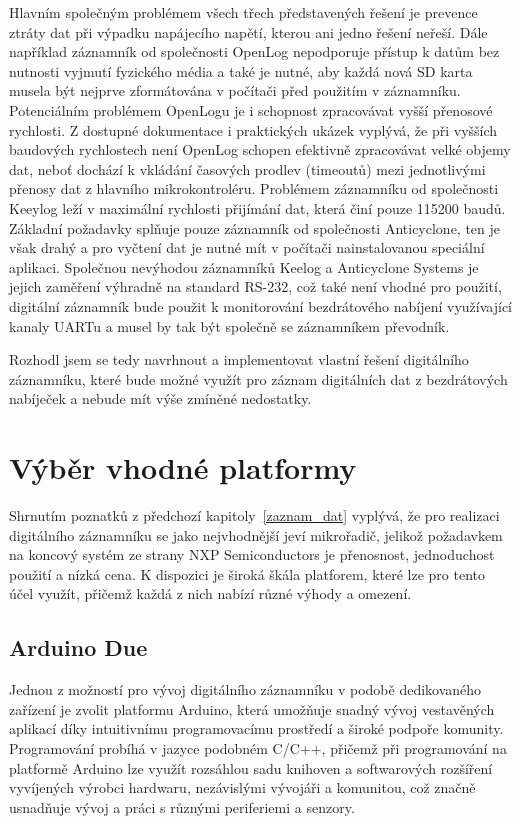 Hlavním společným problémem všech třech představených řešení je prevence ztráty dat při výpadku napájecího napětí, kterou ani jedno řešení neřeší. Dále například záznamník od společnosti OpenLog nepodporuje přístup k datům bez nutnosti vyjmutí fyzického média a také je nutné, aby každá nová SD karta musela být nejprve zformátována v počítači před použitím v záznamníku. Potenciálním problémem OpenLogu je i schopnost zpracovávat vyšší přenosové rychlosti. Z dostupné dokumentace i praktických ukázek vyplývá, že při vyšších baudových rychlostech není OpenLog schopen efektivně zpracovávat velké objemy dat, neboť dochází k vkládání časových prodlev (timeoutů) mezi jednotlivými přenosy dat z hlavního mikrokontroléru. Problémem záznamníku od společnosti Keeylog leží v maximální rychlosti přijímání dat, která činí pouze 115200 baudů. Základní požadavky splňuje pouze záznamník od společnosti Anticyclone, ten je však drahý a pro vyčtení dat je nutné mít v počítači nainstalovanou speciální aplikaci. Společnou nevýhodou záznamníků Keelog a Anticyclone Systems je jejich zaměření výhradně na standard RS-232, což také není vhodné pro použití, digitální záznamník bude použit k monitorování bezdrátového nabíjení využívající kanaly UARTu a musel by tak být společně se záznamníkem převodník.

Rozhodl jsem se tedy navrhnout a implementovat vlastní řešení digitálního záznamníku, které bude možné využít pro záznam digitálních dat z bezdrátových nabíječek a nebude mít výše zmíněné nedostatky.

\section{Výběr vhodné platformy}
\label{vyber_vhodne_platformy}
Shrnutím poznatků z předchozí kapitoly~\ref{zaznam_dat} vyplývá, že pro realizaci digitálního záznamníku se jako nejvhodnější jeví mikrořadič, jelikož požadavkem na koncový systém ze strany NXP Semiconductors je přenosnost, jednoduchost použití a nízká cena. K dispozici je široká škála platforem, které lze pro tento účel využít, přičemž každá z nich nabízí různé výhody a omezení.


\subsection{Arduino Due}
Jednou z možností pro vývoj digitálního záznamníku v podobě dedikovaného zařízení je zvolit platformu Arduino, která umožňuje snadný vývoj vestavěných aplikací díky intuitivnímu programovacímu prostředí a široké podpoře komunity. Programování probíhá v jazyce podobném C/C++, přičemž při programování na platformě Arduino lze využít rozsáhlou sadu knihoven a softwarových rozšíření vyvíjených výrobci hardwaru, nezávislými vývojáři a komunitou, což značně usnadňuje vývoj a práci s různými periferiemi a senzory.


